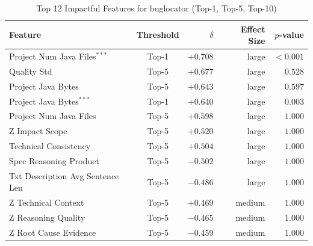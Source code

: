 \begin{table}[h]
\centering
\caption{Top 12 Impactful Features for buglocator (Top-1, Top-5, Top-10)}
\label{tab:tool_features_buglocator_combined}
\begin{tabular}{lcrrr}
\toprule
Feature & Threshold & $\delta$ & Effect Size & $p$-value \\
\midrule
Project Num Java Files$^{***}$ & Top-1 & $+0.708$ & large & $<0.001$ \\
Quality Std & Top-5 & $+0.677$ & large & $0.528$ \\
Project Java Bytes & Top-5 & $+0.643$ & large & $0.597$ \\
Project Java Bytes$^{***}$ & Top-1 & $+0.640$ & large & $0.003$ \\
Project Num Java Files & Top-5 & $+0.598$ & large & $1.000$ \\
Z Impact Scope & Top-5 & $+0.520$ & large & $1.000$ \\
Technical Consistency & Top-5 & $+0.504$ & large & $1.000$ \\
Spec Reasoning Product & Top-5 & $-0.502$ & large & $1.000$ \\
Txt Description Avg Sentence Len & Top-5 & $-0.486$ & large & $1.000$ \\
Z Technical Context & Top-5 & $+0.469$ & medium & $1.000$ \\
Z Reasoning Quality & Top-5 & $-0.465$ & medium & $1.000$ \\
Z Root Cause Evidence & Top-5 & $-0.459$ & medium & $1.000$ \\
\bottomrule
\end{tabular}
\end{table}

